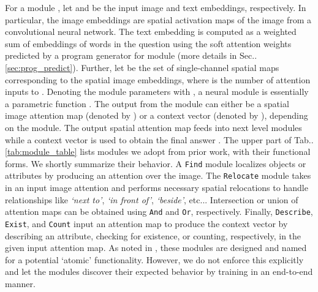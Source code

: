 \documentclass[runningheads]{llncs}
\makeatletter
\DeclareRobustCommand\onedot{\futurelet\@let@token\@onedot}
\def\@onedot{\ifx\@let@token.\else.\null\fi\xspace}
\def\etc{etc\onedot} \def\vs{vs\onedot}
\def\Table{Tab\onedot}
\def\Sec{Sec\onedot}
\def\vs{vs\onedot}
\makeatother
\begin{document}
For a module , let  and  be the input image and text 
embeddings, respectively.
In particular, the image embeddings  are spatial activation
maps of the image  from a convolutional neural network.
The text embedding  is computed as a weighted sum of embeddings
of words in the question  using the soft attention weights 
predicted by a program generator for module  (more details in 
\Sec\ref{sec:prog_predict}).
Further, let  be the set of  single-channel spatial maps 
corresponding to the spatial image embeddings, where  is the number of
attention inputs to .
Denoting the module parameters with , a neural module  is 
essentially a parametric function 
.
The output from the module  can either be a spatial image attention map 
(denoted by ) or a context vector (denoted by ), depending on the module.
The output spatial attention map  feeds into next level modules while a context 
vector  is used to obtain the final answer .
The upper part of \Table\ref{tab:module_table} lists modules we adopt from 
prior work, with their functional forms.
We shortly summarize their behavior.
A \texttt{Find} module localizes objects or attributes by producing an 
attention over the image.
The \texttt{Relocate} module takes in an input image attention and performs
necessary spatial relocations to handle relationships like \textit{`next to'},
\textit{`in front of'}, \textit{`beside'}, \etc.
Intersection or union of attention maps can be obtained using \texttt{And} and \texttt{Or}, respectively.
Finally, \texttt{Describe}, \texttt{Exist}, and \texttt{Count} input an 
attention map to produce the context vector by describing an attribute, 
checking for existence, or counting, respectively, in the given input attention
map.
As noted in \cite{hu2017learning}, these modules are designed and named for
a potential `atomic' functionality.
However, we do not enforce this explicitly and let the modules discover their
expected behavior by training in an end-to-end manner.
\end{document}

